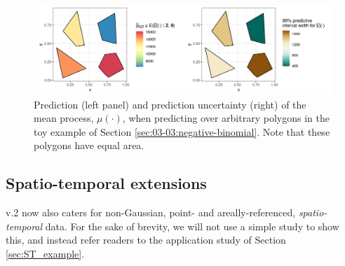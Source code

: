 \documentclass[nojss]{jss}
\begin{document}
\begin{figure}[t!]
    \centering
    \includegraphics[width = \linewidth]{img/Negbinom_sim_arbitrary_polygon_predictions.png}
    \caption{Prediction (left panel) and prediction uncertainty (right) of the mean process, $\mu(\cdot)$, when predicting over arbitrary polygons in the toy example of Section \ref{sec:03-03:negative-binomial}. Note that these polygons have equal area.}   
  \label{fig:03-02-negative-binomial_polygons}
\end{figure}




%


\subsection{Spatio-temporal extensions}\label{sec:03:Additonal_features}

 v.2 now also caters for non-Gaussian, point- and areally-referenced, \textit{spatio-temporal} data. 
For the sake of brevity, we will not use a simple study to show this, and instead refer readers to the application study of Section \ref{sec:ST_example}. 
\end{document}
